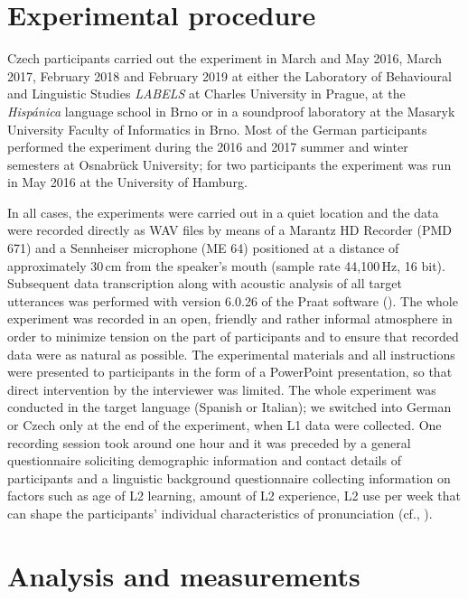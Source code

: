 \section{Experimental procedure}\label{sec:3.3}

Czech participants carried out the experiment in March and May 2016, March 2017, February 2018 and February 2019 at either the Laboratory of Behavioural and Linguistic Studies \textit{LABELS} at Charles University in Prague, at the \textit{Hispánica} language school in Brno or in a soundproof laboratory at the Masaryk University Faculty of Informatics in Brno. Most of the German participants performed the experiment during the 2016 and 2017 summer and winter semesters at Osnabrück University; for two participants the experiment was run in May 2016 at the University of Hamburg.



In all cases, the experiments were carried out in a quiet location and the data were recorded directly as WAV files by means of a Marantz HD Recorder (PMD 671) and a Sennheiser microphone (ME 64) positioned at a distance of approximately 30\,cm from the speaker’s mouth (sample rate 44,100\,Hz, 16 bit). Subsequent data transcription along with acoustic analysis of all target utterances was performed with version 6.0.26 of the Praat software (\citealt{BoersmaWeenink1992-2019}). The whole experiment was recorded in an open, friendly and rather informal atmosphere in order to minimize tension on the part of participants and to ensure that recorded data were as natural as possible. The experimental materials and all instructions were presented to participants in the form of a PowerPoint presentation, so that direct intervention by the interviewer was limited. The whole experiment was conducted in the target language (Spanish or Italian); we switched into German or Czech only at the end of the experiment, when L1 data were collected. One recording session took around one hour and it was preceded by a general questionnaire soliciting demographic information and contact details of participants and a linguistic background questionnaire collecting information on factors such as age of L2 learning, amount of L2 experience, L2 use per week that can shape the participants’ individual characteristics of pronunciation (cf., \citealt{PiskeEtAl2001}).


\section{Analysis and measurements}\label{sec:3.4}

